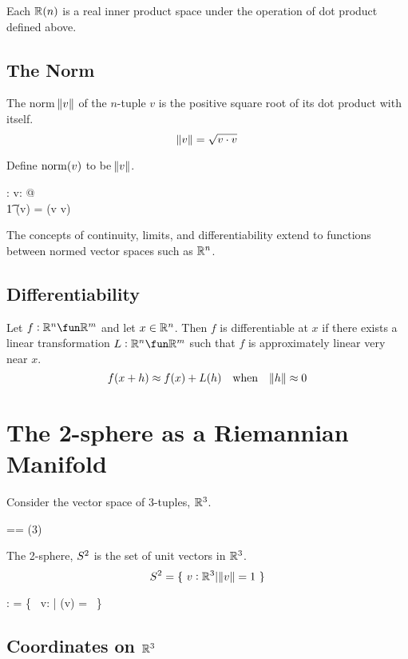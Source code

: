\documentclass[11pt, oneside]{article}
\begin{document}
Each $\mathbb{R}(n)$ is a real inner product space under the operation of dot product defined above.

\subsection{The Norm}

The norm $\norm{v}$ of the $n$-tuple $v$ is the positive square root of its dot product with itself.
$$
	\norm{v} = \sqrt{v \mathbin{\cdot} v}
$$

Define $\operatorname{norm}(v)$ to be $\norm{v}$.
\begin{axdef}
	\normR: \Rinf \fun \R
\where
	\forall v: \Rinf @ \\
	\t1	\normR(v) = \sqrtR(v \dotR v)
\end{axdef}

The concepts of continuity, limits, and differentiability extend to functions between normed vector spaces such as $\mathbb{R}^n$.

\subsection{Differentiability}

Let $f: \R^n \fun \R^m$ and let $x \in \mathbb{R}^n$.
Then $f$ is differentiable at $x$ if there exists a linear transformation $L: \R^n \fun \R^m$
such that $f$ is approximately linear very near $x$.
$$
f(x + h) \approx f(x) + L(h) \quad \text{when} \quad \norm{h} \approx 0
$$ 

\section{The 2-sphere as a Riemannian Manifold}

Consider the vector space of 3-tuples, $\mathbb{R}^3$.
\begin{zed}
	\Rthree == \Rtuples(3)
\end{zed}

The 2-sphere, $S^2$ is the set of unit vectors in $\mathbb{R}^3$.
$$
	S^2 = \{~ v: \mathbb{R}^3 | \norm{v} = 1 ~\}
$$

\begin{axdef}
	\Stwo: \power \Rthree
\where
	\Stwo = \{~ v: \Rthree | \normR(v) = \oneR ~\}
\end{axdef}

\subsection{Coordinates on $\mathbb{R}^3$}
\end{document}
